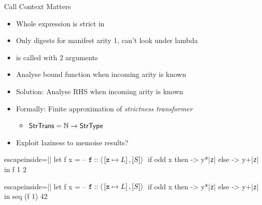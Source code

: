 \documentclass{haskellbeamer}
\begin{document}
\begin{frame}[fragile]{Call Context Matters}
  \begin{overprint}
    \begin{itemize}
      \item Whole expression is strict in 
      \item Only digests  for manifest arity 1, can't look under lambda
      \item {} is called with 2 arguments
      \item<4>[\ding{213}] Analyse bound function when incoming arity is known
    \end{itemize}
    \begin{itemize}
      \item Solution: Analyse RHS when incoming arity is known
      \item Formally: Finite approximation of \emph{strictness transformer}
        \begin{itemize}
          \item $\text{\textsf{StrTrans}} = \mathbb{N} \to \text{\textsf{StrType}}$
        \end{itemize}
      \item Exploit laziness to memoise results?
    \end{itemize}
  \end{overprint}
  \begin{overprint}
    \begin{center}
      \begin{minipage}{0.7\textwidth}
        \begin{haskell*}{escapeinside=||}
          let f x = -- $\mathtt{f} :: \left\langle{}\left[\mathtt{z}\mapsto L\right],[S]\right\rangle{}$
                if odd x
                  then \y -> y*|\color{red}\texttt{z}|
                  else \y -> y+|\color{red}\texttt{z}|
          in f 1 2
        \end{haskell*}
      \end{minipage}
    \end{center}
    \begin{center}
      \begin{minipage}{0.7\textwidth}
        \begin{haskell*}{escapeinside=||}
          let f x = -- $\mathtt{f} :: \left\langle{}\left[\mathtt{z}\mapsto L\right],[S]\right\rangle{}$
                if odd x
                  then \y -> y*|\color{red}\texttt{z}|
                  else \y -> y+|\color{red}\texttt{z}|
          in seq (f 1) 42
        \end{haskell*}

\end{minipage}
\end{center}
\end{overprint}
\end{frame}
\end{document}

